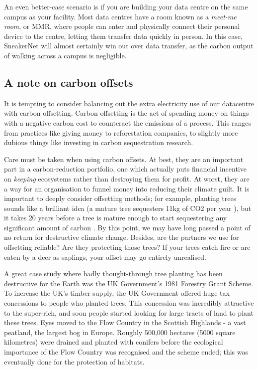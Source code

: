 \documentclass{article}
\begin{document}
An even better-case scenario is if you are building your data centre on the same campus as your facility. Most data centres have a room known as a \emph{meet-me room}, or MMR, where people can enter and physically connect their personal device to the centre, letting them transfer data quickly in person. In this case, SneakerNet will almost certainly win out over data transfer, as the carbon output of walking across a campus is negligible. \newline


\subsection{A note on carbon offsets}
It is tempting to consider balancing out the extra electricity use of our datacentre with carbon offsetting. Carbon offsetting is the act of spending money on things with a negative carbon cost to counteract the emissions of a process. This ranges from practices like giving money to reforestation companies, to slightly more dubious things like investing in carbon sequestration research. \newline

Care must be taken when using carbon offsets. At best, they are an important part in a carbon-reduction portfolio, one which actually puts financial incentive on \emph{keeping} ecosystems rather than destroying them for profit. At worst, they are a way for an organisation to funnel money into reducing their climate guilt. It is important to deeply consider offsetting methods; for example, planting trees sounds like a brilliant idea (a mature tree sequesters 11kg of CO2 per year \citep{akbari2002shade}), but it takes 20 years before a tree is mature enough to start sequestering any significant amount of carbon \citep{ghussain2020biggest}. By this point, we may have long passed a point of no return for destructive climate change. Besides, are the partners we use for offsetting reliable? Are they protecting those trees? If your trees catch fire or are eaten by a deer as saplings, your offset may go entirely unrealised. \newline

A great case study where badly thought-through tree planting has been destructive for the Earth was the UK Government's 1981 Forestry Grant Scheme. To increase the UK's timber supply, the UK Government offered huge tax concessions to people who planted trees. \citep{watkins1983public} This concession was incredibly attractive to the super-rich, and soon people started looking for large tracts of land to plant these trees. Eyes moved to the Flow Country in the Scottish Highlands - a vast peatland, the largest bog in Europe. Roughly 500,000 hectares (5000 square kilometres) were drained and planted with conifers before the ecological importance of the Flow Country was recognised and the scheme ended; this was eventually done for the protection of habitats. 
\end{document}
